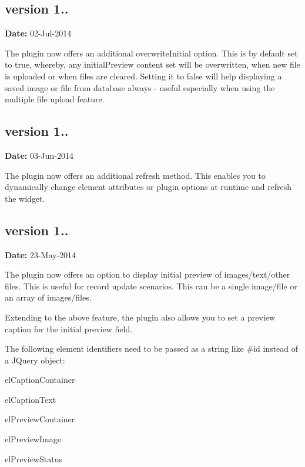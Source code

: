\subsection*{version 1..}

{\bfseries Date\+:} 02-\/\+Jul-\/2014


\begin{DoxyItemize}
\item The plugin now offers an additional {\ttfamily overwrite\+Initial} option. This is by default set to {\ttfamily true}, whereby, any {\ttfamily initial\+Preview} content set will be overwritten, when new file is uploaded or when files are cleared. Setting it to {\ttfamily false} will help displaying a saved image or file from database always -\/ useful especially when using the {\ttfamily multiple} file upload feature.
\end{DoxyItemize}

\subsection*{version 1..}

{\bfseries Date\+:} 03-\/\+Jun-\/2014


\begin{DoxyItemize}
\item The plugin now offers an additional {\ttfamily refresh} method. This enables you to dynamically change element attributes or plugin options at runtime and refresh the widget.
\end{DoxyItemize}

\subsection*{version 1..}

{\bfseries Date\+:} 23-\/\+May-\/2014


\begin{DoxyItemize}
\item The plugin now offers an option to display initial preview of images/text/other files. This is useful for record update scenarios. This can be a single image/file or an array of images/files.
\item Extending to the above feature, the plugin also allows you to set a preview caption for the initial preview field.
\item The following element identifiers need to be passed as a string like \textquotesingle{}\#id\textquotesingle{} instead of a J\+Query object\+:
\begin{DoxyItemize}
\item el\+Caption\+Container
\item el\+Caption\+Text
\item el\+Preview\+Container
\item el\+Preview\+Image
\item el\+Preview\+Status
\end{DoxyItemize}
\end{DoxyItemize}

